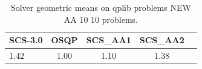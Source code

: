 \begin{table}
\centering
\caption{Solver geometric means on qplib problems NEW AA 10 10 problems.}
\label{t-qplib problems NEW AA 10 10-geom_mean}
\begin{tabular}{lcccc}
\toprule
 SCS-3.0 &  OSQP &  SCS\_AA1 &  SCS\_AA2 \\
\midrule
    1.42 &  1.00 &     1.10 &     1.38 \\
\bottomrule
\end{tabular}
\end{table}
